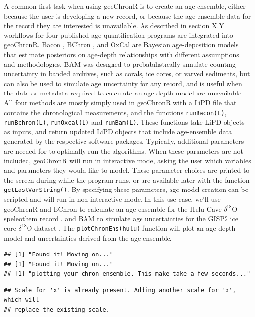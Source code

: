 \documentclass[gc, manuscript]{copernicus}
\begin{document}
A common first task when using geoChronR is to create an age ensemble,
either because the user is developing a new record, or because the age
ensemble data for the record they are interested is unavailable. As
described in section X.Y workflows for four published age quantification
programs are integrated into geoChronR. Bacon \citep{bacon}, BChron
\citep{parnell2008flexible}, and OxCal \citep{ramsey2008deposition} are
Bayesian age-deposition models that estimate posteriors on age-depth
relationships with different assumptions and methodologies. BAM
\citep{BAM} was designed to probabilistically simulate counting
uncertainty in banded archives, such as corals, ice cores, or varved
sediments, but can also be used to simulate age uncertainty for any
record, and is useful when the data or metadata required to calculate an
age-depth model are unavailable. All four methods are mostly simply used
in geoChronR with a LiPD file that contains the chronological
measurements, and the functions \texttt{runBacon(L)},
\texttt{runBchron(L)}, \texttt{runOxcal(L)} and \texttt{runBam(L)}.
These functions take LiPD objects as inputs, and return updated LiPD
objects that include age-ensemble data generated by the respective
software packages. Typically, additional parameters are needed for to
optimally run the algorithms. When these parameters are not included,
geoChronR will run in interactive mode, asking the user which variables
and parameters they would like to model. These parameter choices are
printed to the screen during while the program runs, or are available
later with the function \texttt{getLastVarString()}. By specifying these
parameters, age model creation can be scripted and will run in
non-interactive mode. In this use case, we'll use geoChronR and BChron
\citep{parnell2008flexible} to calculate an age ensemble for the Hulu
Cave \(\delta^{18}\)O speleothem record \citep{hulu2001}, and BAM
\citep{BAM} to simulate age uncertainties for the GISP2 ice core
\(\delta^{18}\)O dataset \citep{alley}. The \texttt{plotChronEns(hulu)}
function will plot an age-depth model and uncertainties derived from the
age ensemble.

\begin{verbatim}
## [1] "Found it! Moving on..."
## [1] "Found it! Moving on..."
## [1] "plotting your chron ensemble. This make take a few seconds..."
\end{verbatim}

\begin{verbatim}
## Scale for 'x' is already present. Adding another scale for 'x', which will
## replace the existing scale.
\end{verbatim}
\end{document}
